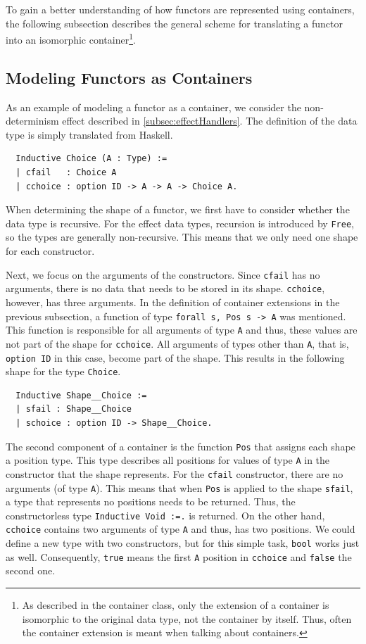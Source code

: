 \documentclass[a4paper, 11pt, fleqn, twoside]{scrreprt}
\newcommand{\hinl}[1]{\texttt{#1}}
\newcommand{\cinl}[1]{\texttt{#1}}
\begin{document}
To gain a better understanding of how functors are represented using containers, the following subsection describes the general scheme for translating a functor into an isomorphic container\footnote{As described in the container class, only the extension of a container is isomorphic to the original data type, not the container by itself. Thus, often the container extension is meant when talking about containers.}.

\subsection{Modeling Functors as Containers}
As an example of modeling a functor as a container, we consider the non-determinism effect described in \autoref{subsec:effectHandlers}.
The definition of the data type is simply translated from Haskell.

\begin{verbatim}
  Inductive Choice (A : Type) :=
  | cfail   : Choice A
  | cchoice : option ID -> A -> A -> Choice A.
\end{verbatim}

When determining the shape of a functor, we first have to consider whether the data type is recursive.
For the effect data types, recursion is introduced by \cinl{Free}, so the types are generally non-recursive.
This means that we only need one shape for each constructor.

Next, we focus on the arguments of the constructors.
Since \cinl{cfail} has no arguments, there is no data that needs to be stored in its shape.
\cinl{cchoice}, however, has three arguments.
In the definition of container extensions in the previous subsection, a function of type \cinl{forall s, Pos s -> A} was mentioned.
This function is responsible for all arguments of type \cinl{A} and thus, these values are not part of the shape for \cinl{cchoice}.
All arguments of types other than \cinl{A}, that is, \cinl{option ID} in this case, become part of the shape.
This results in the following shape for the type \cinl{Choice}.

\begin{verbatim}
  Inductive Shape__Choice :=
  | sfail : Shape__Choice
  | schoice : option ID -> Shape__Choice.
\end{verbatim}

The second component of a container is the function \cinl{Pos} that assigns each shape a position type.
This type describes all positions for values of type \cinl{A} in the constructor that the shape represents.
For the \cinl{cfail} constructor, there are no arguments (of type \cinl{A}).
This means that when \cinl{Pos} is applied to the shape \cinl{sfail}, a type that represents no positions needs to be returned.
Thus, the constructorless type \cinl{Inductive Void :=.} is returned.
On the other hand, \hinl{cchoice} contains two arguments of type \cinl{A} and thus, has two positions.
We could define a new type with two constructors, but for this simple task, \cinl{bool} works just as well.
Consequently, \cinl{true} means the first \cinl{A} position in \cinl{cchoice} and \cinl{false} the second one.
\end{document}
